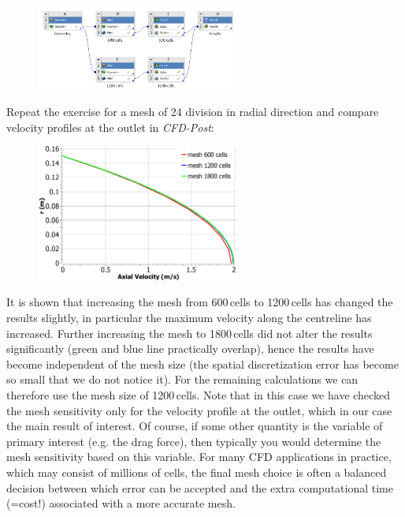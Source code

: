 \documentclass[11pt,a4paper,oneside,hidelinks]{scrartcl}
\begin{document}
\begin{itemize}
    \begin{figure}[H]
    \begin{center}
    \includegraphics[width=0.6\textwidth,clip]{workbench_finemesh.png}
    \end{center}
    \end{figure}

    Repeat the exercise for a mesh of 24 division in radial direction and compare velocity profiles at the outlet in \emph{CFD-Post}:
    \begin{figure}[H]
    \begin{center}
    \includegraphics[width=0.6\textwidth,clip]{Mesh_sensitivity.png}
    \end{center}
    \end{figure}
    It is shown that increasing the mesh from 600\,cells to 1200\,cells has changed the results slightly, in particular the maximum velocity along the centreline has increased. Further increasing the mesh to 1800\,cells did not alter the results significantly (green and blue line practically overlap), hence the results have become independent of the mesh size (the spatial discretization error has become so small that we do not notice it). For the remaining calculations we can therefore use the mesh size of 1200\,cells. Note that in this case we have checked the mesh sensitivity only for the velocity profile at the outlet, which in our case the main result of interest. Of course, if some other quantity is the variable of primary interest (e.g. the drag force), then typically you would determine the mesh sensitivity based on this variable. For many CFD applications in practice, which may consist of millions of cells, the final mesh choice is often a balanced decision between which error can be accepted and the extra computational time (=cost!) associated with a more accurate mesh.
\end{itemize}
\end{document}
